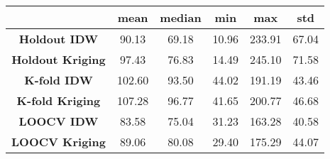 \begin{tabular}{|c|c|c|c|c|c|}
\toprule
 & mean & median & min & max & std \\
\midrule
\textbf{Holdout IDW} & 90.13 & 69.18 & 10.96 & 233.91 & 67.04 \\
\textbf{Holdout Kriging} & 97.43 & 76.83 & 14.49 & 245.10 & 71.58 \\
\textbf{K-fold IDW} & 102.60 & 93.50 & 44.02 & 191.19 & 43.46 \\
\textbf{K-fold Kriging} & 107.28 & 96.77 & 41.65 & 200.77 & 46.68 \\
\textbf{LOOCV IDW} & 83.58 & 75.04 & 31.23 & 163.28 & 40.58 \\
\textbf{LOOCV Kriging} & 89.06 & 80.08 & 29.40 & 175.29 & 44.07 \\
\bottomrule
\end{tabular}
